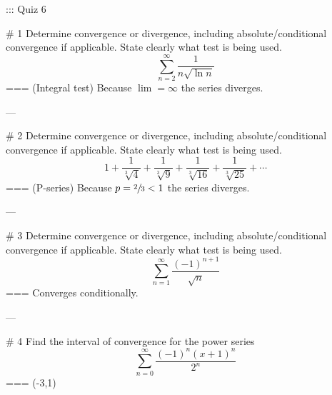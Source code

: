 ::: Quiz 6

# 1
Determine convergence or divergence, including absolute/conditional convergence
if applicable. State clearly what test is being used.
\[\sum_{n=2}^\infty \frac{1}{n\sqrt{\ln n}}\]
===
(Integral test) Because \(\lim=\infty\) the series diverges.

---

# 2
Determine convergence or divergence, including absolute/conditional convergence
if applicable. State clearly what test is being used.
\[1+\frac{1}{\sqrt[3]{4}}+\frac{1}{\sqrt[3]{9}}+\frac{1}{\sqrt[3]{16}}+\frac{1}{\sqrt[3]{25}}+\cdots\]
===
(P-series) Because \(p=\sfrac{2}{3}<1\) the series diverges.

---

# 3
Determine convergence or divergence, including absolute/conditional convergence
if applicable. State clearly what test is being used.
\[\sum_{n=1}^\infty \frac{{(-1)}^{n+1}}{\sqrt{n}}\]
===
Converges conditionally.

---

# 4
Find the interval of convergence for the power series
\[\sum_{n=0}^\infty \frac{{(-1)}^n{(x+1)}^n}{2^n}\]
===
(-3,1)



